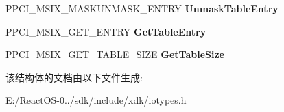 \begin{DoxyCompactItemize}
\mbox{\label{struct___p_c_i___m_s_i_x___t_a_b_l_e___c_o_n_f_i_g___i_n_t_e_r_f_a_c_e_a87d860655e51e10235e6c9f9e389969f}} 
P\+P\+C\+I\+\_\+\+M\+S\+I\+X\+\_\+\+M\+A\+S\+K\+U\+N\+M\+A\+S\+K\+\_\+\+E\+N\+T\+RY {\bfseries Unmask\+Table\+Entry}
\item 
\mbox{\label{struct___p_c_i___m_s_i_x___t_a_b_l_e___c_o_n_f_i_g___i_n_t_e_r_f_a_c_e_af870bddcc8d5522dfd818f0adfe404fb}} 
P\+P\+C\+I\+\_\+\+M\+S\+I\+X\+\_\+\+G\+E\+T\+\_\+\+E\+N\+T\+RY {\bfseries Get\+Table\+Entry}
\item 
\mbox{\label{struct___p_c_i___m_s_i_x___t_a_b_l_e___c_o_n_f_i_g___i_n_t_e_r_f_a_c_e_a212e8c9e32abc35a5ee7de1dd57b604c}} 
P\+P\+C\+I\+\_\+\+M\+S\+I\+X\+\_\+\+G\+E\+T\+\_\+\+T\+A\+B\+L\+E\+\_\+\+S\+I\+ZE {\bfseries Get\+Table\+Size}
\end{DoxyCompactItemize}


该结构体的文档由以下文件生成\+:\begin{DoxyCompactItemize}
\item 
E\+:/\+React\+O\+S-\/0../sdk/include/xdk/iotypes.\+h\end{DoxyCompactItemize}
